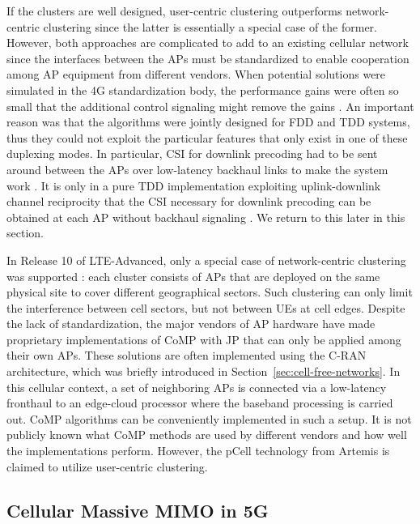 If the clusters are well designed, user-centric clustering outperforms network-centric clustering since the latter is essentially a special case of the former.
However, both approaches are complicated to add to an existing cellular network since the interfaces between the \glspl{AP} must be standardized to enable cooperation among \gls{AP} equipment from different vendors. When potential solutions were simulated in the 4G standardization body, the performance gains were often so small that the additional control signaling might remove the gains \cite{Boldi2011a}. 
An important reason was that the algorithms were jointly designed for \gls{FDD} and \gls{TDD} systems, thus they could not exploit the particular features that only exist in one of these duplexing modes. In particular, \gls{CSI} for downlink precoding had to be sent around between the \glspl{AP} over low-latency backhaul links to make the system work \cite{Fantini2016a}. It is only in a pure \gls{TDD} implementation exploiting uplink-downlink channel reciprocity that the \gls{CSI} necessary for downlink precoding can be obtained at each \gls{AP} without backhaul signaling \cite{Bjornson2010c}. We return to this later in this section.
\enlargethispage{\baselineskip} 

In Release 10 of LTE-Advanced, only a special case of network-centric clustering was supported \cite{Boldi2011a}: each cluster consists of \glspl{AP} that are deployed on the same physical site to cover different geographical sectors. Such clustering can only limit the interference between cell sectors, but not between \glspl{UE} at cell edges. Despite the lack of standardization, the major vendors of \gls{AP} hardware have made proprietary implementations of \gls{CoMP} with \gls{JP} that can only be applied among their own \glspl{AP}. 
These solutions are often implemented using the \gls{C-RAN} architecture, which was briefly introduced in Section~\ref{sec:cell-free-networks}. In this cellular context, a set of neighboring \glspl{AP} is connected via a low-latency fronthaul to an edge-cloud processor where the baseband processing is carried out. \gls{CoMP} algorithms can be conveniently implemented in such a setup.
It is not publicly known what \gls{CoMP} methods are used by different vendors and how well the implementations perform.
However, the pCell technology from Artemis \cite{Perlman2015a} is claimed to utilize user-centric clustering.


\subsection{Cellular Massive \gls{MIMO} in 5G}

